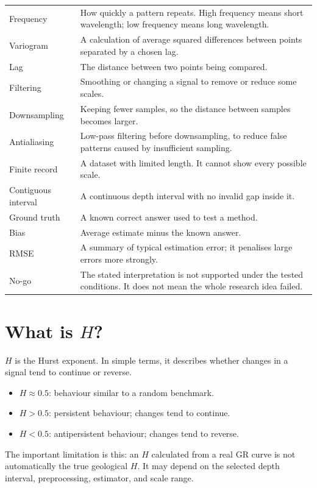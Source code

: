 \documentclass[11pt,a4paper]{article}
\begin{document}
\begin{tabular}{>{\raggedright\arraybackslash}p{} p{}}
Frequency & How quickly a pattern repeats. High frequency means short wavelength; low frequency means long wavelength.\\
Variogram & A calculation of average squared differences between points separated by a chosen lag.\\
Lag & The distance between two points being compared.\\
Filtering & Smoothing or changing a signal to remove or reduce some scales.\\
Downsampling & Keeping fewer samples, so the distance between samples becomes larger.\\
Antialiasing & Low-pass filtering before downsampling, to reduce false patterns caused by insufficient sampling.\\
Finite record & A dataset with limited length. It cannot show every possible scale.\\
Contiguous interval & A continuous depth interval with no invalid gap inside it.\\
Ground truth & A known correct answer used to test a method.\\
Bias & Average estimate minus the known answer.\\
RMSE & A summary of typical estimation error; it penalises large errors more strongly.\\
No-go & The stated interpretation is not supported under the tested conditions. It does not mean the whole research idea failed.\\
\bottomrule
\end{tabular}

\section{What is $H$?}
$H$ is the Hurst exponent. In simple terms, it describes whether changes in a signal tend to continue or reverse.

\begin{itemize}
\item $H\approx0.5$: behaviour similar to a random benchmark.
\item $H>0.5$: persistent behaviour; changes tend to continue.
\item $H<0.5$: antipersistent behaviour; changes tend to reverse.
\end{itemize}

The important limitation is this: an $H$ calculated from a real GR curve is not automatically the true geological $H$. It may depend on the selected depth interval, preprocessing, estimator, and scale range.
\end{document}
